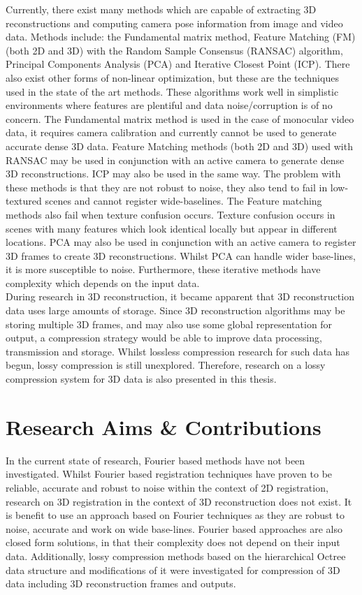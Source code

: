 Currently, there exist many methods which are capable of extracting 3D reconstructions and computing camera pose information from image and video data. Methods include: the Fundamental matrix method, Feature Matching (FM) (both 2D and 3D) with the Random Sample Consensus (RANSAC) algorithm, Principal Components Analysis (PCA) and Iterative Closest Point (ICP). There also exist other forms of non-linear optimization, but these are the techniques used in the state of the art methods. These algorithms work well in simplistic environments where features are plentiful and data noise/corruption is of no concern. The Fundamental matrix method is used in the case of monocular video data, it requires camera calibration and currently cannot be used to generate accurate dense 3D data. Feature Matching methods (both 2D and 3D) used with RANSAC may be used in conjunction with an active camera to generate dense 3D reconstructions. ICP may also be used in the same way. The problem with these methods is that they are not robust to noise, they also tend to fail in low-textured scenes and cannot register wide-baselines. The Feature matching methods also fail when texture confusion occurs. Texture confusion occurs in scenes with many features which look identical locally but appear in different locations. PCA may also be used in conjunction with an active camera to register 3D frames to create 3D reconstructions. Whilst PCA can handle wider base-lines, it is more susceptible to noise. Furthermore, these iterative methods have complexity which depends on the input data. \\


During research in 3D reconstruction, it became apparent that 3D reconstruction data uses large amounts of storage. Since 3D reconstruction algorithms may be storing multiple 3D frames, and may also use some global representation for output, a compression strategy would be able to improve data processing, transmission and storage. Whilst lossless compression research for such data has begun, lossy compression is still unexplored. Therefore, research on a lossy compression system for 3D data is also presented in this thesis. \\


\section{Research Aims \& Contributions}

In the current state of research, Fourier based methods have not been investigated. Whilst Fourier based registration techniques have proven to be reliable, accurate and robust to noise within the context of 2D registration, research on 3D registration in the context of 3D reconstruction does not exist. It is benefit to use an approach based on Fourier techniques as they are robust to noise, accurate and work on wide base-lines. Fourier based approaches are also closed form solutions, in that their complexity does not depend on their input data. Additionally, lossy compression methods based on the hierarchical Octree data structure and modifications of it \cite{Lincoln13Interpolating} were investigated for compression of 3D data including 3D reconstruction frames and outputs. \\

